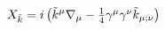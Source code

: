 \begin{equation}\label{kil}
X_{\tilde k} = i \left(\tilde k^\mu \nabla_\mu - \textstyle{1\over 4} 
\gamma^\mu \gamma^\nu 
\tilde k_{\mu;\nu}\right)
\end{equation}

